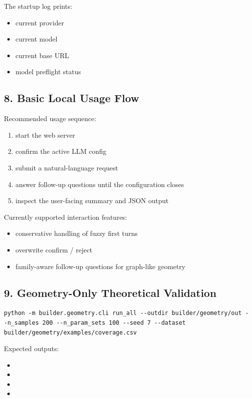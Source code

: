 \documentclass[11pt,a4paper]{ctexart}
\begin{document}
The startup log prints:

\begin{itemize}
\item current provider
\item current model
\item current base URL
\item model preflight status
\end{itemize}

\subsection*{8. Basic Local Usage Flow}

Recommended usage sequence:

\begin{enumerate}
\item start the web server
\item confirm the active LLM config
\item submit a natural-language request
\item answer follow-up questions until the configuration closes
\item inspect the user-facing summary and JSON output
\end{enumerate}

Currently supported interaction features:

\begin{itemize}
\item conservative handling of fuzzy first turns
\item overwrite confirm / reject
\item family-aware follow-up questions for graph-like geometry
\end{itemize}

\subsection*{9. Geometry-Only Theoretical Validation}

\begin{verbatim}
python -m builder.geometry.cli run_all --outdir builder/geometry/out --n_samples 200 --n_param_sets 100 --seed 7 --dataset builder/geometry/examples/coverage.csv
\end{verbatim}

Expected outputs:

\begin{itemize}
\item {}
\item {}
\item {}
\item {}
\end{itemize}
\end{document}
